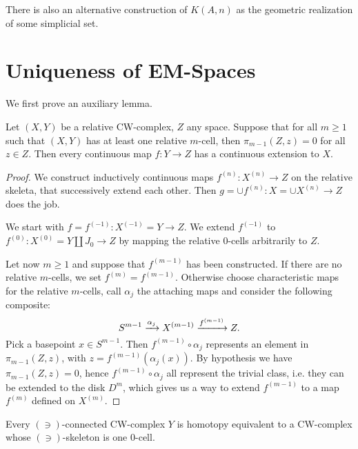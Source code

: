There is also an alternative construction of $K(A,n)$ as the geometric realization of some simplicial set.

\section{Uniqueness of EM-Spaces}

We first prove an auxiliary lemma.

\begin{lemma}\label{theorem:extension-theorem}
Let $(X,Y)$ be a relative CW-complex, $Z$ any space. Suppose that for all $m\geq1$ such that $(X,Y)$ has at least one relative $m$-cell, then $\pi_{m-1}(Z,z)=0$ for all $z\in Z$. Then every continuous map $f:Y\to Z$ has a continuous extension to $X$.
\end{lemma}

\begin{proof}
We construct inductively continuous maps $f^{(n)}:X^{(n)}\to Z$ on the relative skeleta, that successively extend each other. Then $g=\cup f^{(n)}:X=\cup X^{(n)}\to Z$ does the job.

We start with $f=f^{(-1)}:X^{(-1)}=Y\to Z$. We extend $f^{(-1)}$ to $f^{(0)}:X^{(0)}=Y\amalg J_0\to Z$ by mapping the relative $0$-cells arbitrarily to $Z$.

Let now $m\ge1$ and suppose that $f^{(m-1)}$ has been constructed. If there are no relative $m$-cells, we set $f^{(m)}=f^{(m-1)}$. Otherwise choose characteristic maps for the relative $m$-cells, call $\alpha_j$ the attaching maps and consider the following composite:
\[S^{m-1}\xrightarrow{\alpha_j}X^{(m-1)}\xrightarrow{ f^{(m-1)}}Z.\]
Pick a basepoint $x\in S^{m-1}$. Then $f^{(m-1)}\circ\alpha_j$ represents an element in $\pi_{m-1}(Z,z)$, with $z=f^{(m-1)}(\alpha_j(x))$. By hypothesis we have $\pi_{m-1}(Z,z)=0$, hence $f^{(m-1)}\circ\alpha_j$ all represent the trivial class, i.e. they can be extended to the disk $D^m$, which gives us a way to extend $f^{(m-1)}$ to a map $f^{(m)}$ defined on $X^{(m)}$.
\end{proof}

\begin{theorem}\label{theorem:single-0-cell-complex}
Every $(\ni)$-connected CW-complex $Y$ is homotopy equivalent to a CW-complex whose $(\ni)$-skeleton is one $0$-cell.
\end{theorem}

